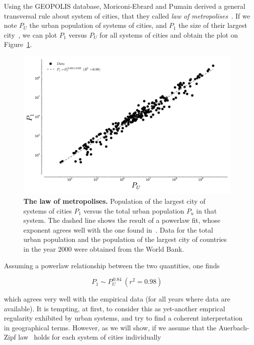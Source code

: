 Using the GEOPOLIS database, Moriconi-Ebrard and Pumain derived a general transversal rule about system
of cities, that they called \emph{law of metropolises}~\cite{Pumain:1997}. If we
note $P_U$ the urban population of systems of cities, and $P_1$ the size of
their largest city~, we can
plot $P_1$ versus $P_U$ for all systems of cities and obtain the plot on
Figure~\ref{fig:metropolises}.

\begin{figure}
    \centering
    \includegraphics[width=\textwidth]{gfx/chapter-intro/law_metropolises.pdf}
    \caption{{\bf The law of metropolises.} Population of the largest city of
    systems of cities $P_1$ versus the total urban population $P_u$ in that
system. The dashed line shows the result of a powerlaw fit, whose exponent
agrees well with the one found in~\cite{Pumain:1997}. Data for the total urban
population and the population of the largest city of countries in the year
$2000$ were obtained from
the World Bank.\label{fig:metropolises}}
\end{figure}

Assuming a powerlaw relationship between the two quantities, one finds

\begin{equation}
    P_1 \sim P_U^{\,0.84}\:(r^2=0.98)
    \label{eq:metropolis}
\end{equation}

which agrees very well with the empirical data (for all years where data are
available). It is tempting, at first, to consider this as yet-another emprical
regularity exhibited by urban systems, and try to find a coherent interpretation
in geographical terms. However, as we will show, if we assume that the Auerbach-Zipf
law~\cite{Auerbach:1913,Zipf:1949} holds for each system of cities
individually

